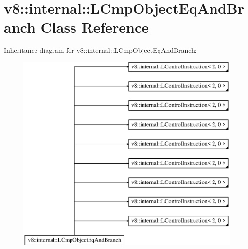 \hypertarget{classv8_1_1internal_1_1_l_cmp_object_eq_and_branch}{}\section{v8\+:\+:internal\+:\+:L\+Cmp\+Object\+Eq\+And\+Branch Class Reference}
\label{classv8_1_1internal_1_1_l_cmp_object_eq_and_branch}
Inheritance diagram for v8\+:\+:internal\+:\+:L\+Cmp\+Object\+Eq\+And\+Branch\+:\begin{figure}[H]
\begin{center}
\leavevmode
\includegraphics[height=10.000000cm]{classv8_1_1internal_1_1_l_cmp_object_eq_and_branch}
\end{center}
\end{figure}
